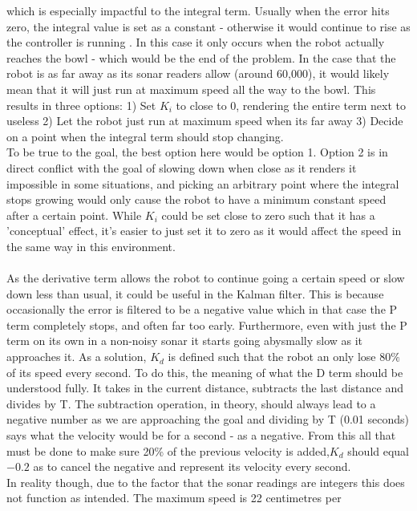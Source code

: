 \documentclass{article}
\newcommand\tab[1][1cm]{\hspace*{#1}}
\begin{document}
which is especially impactful to the integral term. Usually when the 
error hits zero, the integral value is set as a constant - otherwise it would
continue to rise as the controller is running \cite{kalman}. In this case it only
occurs when the robot actually reaches the bowl - which would be the end of the
problem. In the case that the robot is as far away as its sonar readers allow
(around 60,000), it would likely mean that it will just run at maximum speed all
the way to the bowl. This results in three options: 1) Set $K_i$ to close to 0,
rendering the entire term next to useless 2) Let the robot just run at maximum speed
when its far away 3) Decide on a point when the integral term should stop
changing. \\ 
\tab To be true to the goal, the best option here would be option 1. Option 2 is
in direct conflict with the goal of slowing down when close as it renders it
impossible in some situations, and picking an arbitrary point where the integral
stops growing would only cause the robot to have a minimum constant speed after
a certain point. While $K_i$ could be set close to zero such that it has a
'conceptual' effect, it's easier to just set it to zero as it would affect the
speed in the same way in this environment.
\\ \\
As the derivative term allows the robot to continue going a certain speed
or slow down less than usual, it could be useful in the Kalman filter. This is
because occasionally the error is filtered to be a negative value which in that
case the P term completely stops, and often far too early. Furthermore, even
with just the P term on its own in a non-noisy sonar it starts going abysmally
slow as it approaches it. As a solution, $K_d$ is defined such that the robot
an only lose $80\%$ of its speed every second. To do this, the meaning of what
the D term should be understood fully. It takes in the current distance,
subtracts the last distance and divides by T. The subtraction operation, in
theory, should always lead to a negative number as we are approaching the goal
and dividing by T (0.01 seconds) says what the velocity would be for a second -
as a negative. From this all that must be done to make sure 20\% of the previous
velocity is added,$K_d$ should equal $-0.2$ as to cancel the negative and
represent its velocity every second.
\\
\tab In reality though, due to the factor that the sonar readings are integers
this does not function as intended. The maximum speed is 22 centimetres per
\end{document}
